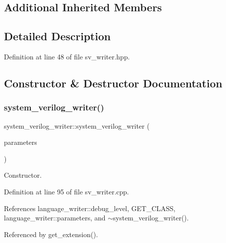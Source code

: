 \subsection*{Additional Inherited Members}


\subsection{Detailed Description}


Definition at line 48 of file sv\+\_\+writer.\+hpp.



\subsection{Constructor \& Destructor Documentation}
\mbox{\label{classsystem__verilog__writer_ad58c38bd3ac975232c9e99460873fd38}} 
\subsubsection{\texorpdfstring{system\+\_\+verilog\+\_\+writer()}{system\_verilog\_writer()}}
{\footnotesize\ttfamily system\+\_\+verilog\+\_\+writer\+::system\+\_\+verilog\+\_\+writer (\begin{DoxyParamCaption}\item[{const \hyperlink{Parameter_8hpp_a37841774a6fcb479b597fdf8955eb4ea}{Parameter\+Const\+Ref}}]{parameters }\end{DoxyParamCaption})\hspace{0.3cm}{\ttfamily [explicit]}}



Constructor. 



Definition at line 95 of file sv\+\_\+writer.\+cpp.



References language\+\_\+writer\+::debug\+\_\+level, G\+E\+T\+\_\+\+C\+L\+A\+SS, language\+\_\+writer\+::parameters, and $\sim$system\+\_\+verilog\+\_\+writer().



Referenced by get\+\_\+extension().

